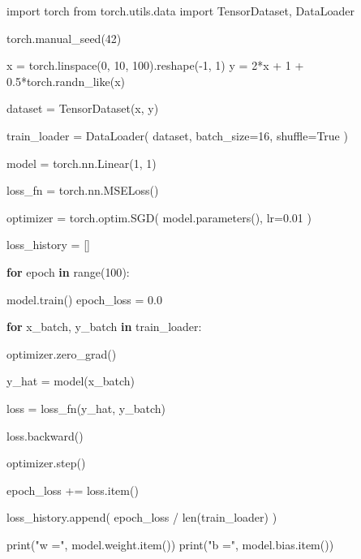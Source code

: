 \documentclass[
  letterpaper,
  DIV=11,
  numbers=noendperiod]{scrartcl}
\newenvironment{Shaded}{\begin{snugshade}}{\end{snugshade}}
\newcommand{\BuiltInTok}[1]{\textcolor[rgb]{0.00,0.23,0.31}{#1}}
\newcommand{\ControlFlowTok}[1]{\textcolor[rgb]{0.00,0.23,0.31}{\textbf{#1}}}
\newcommand{\DecValTok}[1]{\textcolor[rgb]{0.68,0.00,0.00}{#1}}
\newcommand{\FloatTok}[1]{\textcolor[rgb]{0.68,0.00,0.00}{#1}}
\newcommand{\ImportTok}[1]{\textcolor[rgb]{0.00,0.46,0.62}{#1}}
\newcommand{\KeywordTok}[1]{\textcolor[rgb]{0.00,0.23,0.31}{\textbf{#1}}}
\newcommand{\NormalTok}[1]{\textcolor[rgb]{0.00,0.23,0.31}{#1}}
\newcommand{\OperatorTok}[1]{\textcolor[rgb]{0.37,0.37,0.37}{#1}}
\newcommand{\StringTok}[1]{\textcolor[rgb]{0.13,0.47,0.30}{#1}}
\newcommand{\VariableTok}[1]{\textcolor[rgb]{0.07,0.07,0.07}{#1}}
\begin{document}
\protect{}\label{pytorch-linear-regression}
\begin{Shaded}
\begin{Highlighting}[]
\ImportTok{import}\NormalTok{ torch}
\ImportTok{from}\NormalTok{ torch.utils.data }\ImportTok{import}\NormalTok{ TensorDataset, DataLoader}

\NormalTok{torch.manual\_seed(}\DecValTok{42}\NormalTok{)}

\NormalTok{x }\OperatorTok{=}\NormalTok{ torch.linspace(}\DecValTok{0}\NormalTok{, }\DecValTok{10}\NormalTok{, }\DecValTok{100}\NormalTok{).reshape(}\OperatorTok{{-}}\DecValTok{1}\NormalTok{, }\DecValTok{1}\NormalTok{)}
\NormalTok{y }\OperatorTok{=} \DecValTok{2}\OperatorTok{*}\NormalTok{x }\OperatorTok{+} \DecValTok{1} \OperatorTok{+} \FloatTok{0.5}\OperatorTok{*}\NormalTok{torch.randn\_like(x)}

\NormalTok{dataset }\OperatorTok{=}\NormalTok{ TensorDataset(x, y)}

\NormalTok{train\_loader }\OperatorTok{=}\NormalTok{ DataLoader(}
\NormalTok{    dataset,}
\NormalTok{    batch\_size}\OperatorTok{=}\DecValTok{16}\NormalTok{,}
\NormalTok{    shuffle}\OperatorTok{=}\VariableTok{True}
\NormalTok{)}

\NormalTok{model }\OperatorTok{=}\NormalTok{ torch.nn.Linear(}\DecValTok{1}\NormalTok{, }\DecValTok{1}\NormalTok{)}

\NormalTok{loss\_fn }\OperatorTok{=}\NormalTok{ torch.nn.MSELoss()}

\NormalTok{optimizer }\OperatorTok{=}\NormalTok{ torch.optim.SGD(}
\NormalTok{    model.parameters(),}
\NormalTok{    lr}\OperatorTok{=}\FloatTok{0.01}
\NormalTok{)}

\NormalTok{loss\_history }\OperatorTok{=}\NormalTok{ []}

\ControlFlowTok{for}\NormalTok{ epoch }\KeywordTok{in} \BuiltInTok{range}\NormalTok{(}\DecValTok{100}\NormalTok{):}

\NormalTok{    model.train()}
\NormalTok{    epoch\_loss }\OperatorTok{=} \FloatTok{0.0}

    \ControlFlowTok{for}\NormalTok{ x\_batch, y\_batch }\KeywordTok{in}\NormalTok{ train\_loader:}

\NormalTok{        optimizer.zero\_grad()}

\NormalTok{        y\_hat }\OperatorTok{=}\NormalTok{ model(x\_batch)}

\NormalTok{        loss }\OperatorTok{=}\NormalTok{ loss\_fn(y\_hat, y\_batch)}

\NormalTok{        loss.backward()}

\NormalTok{        optimizer.step()}

\NormalTok{        epoch\_loss }\OperatorTok{+=}\NormalTok{ loss.item()}

\NormalTok{    loss\_history.append(}
\NormalTok{        epoch\_loss }\OperatorTok{/} \BuiltInTok{len}\NormalTok{(train\_loader)}
\NormalTok{    )}

\BuiltInTok{print}\NormalTok{(}\StringTok{"w ="}\NormalTok{, model.weight.item())}
\BuiltInTok{print}\NormalTok{(}\StringTok{"b ="}\NormalTok{, model.bias.item())}
\end{Highlighting}
\end{Shaded}
\end{document}
